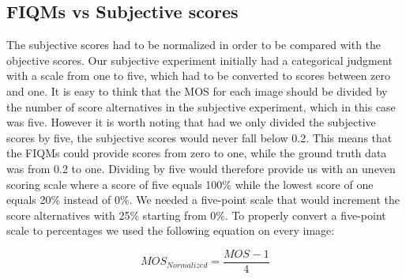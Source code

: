 \subsection{FIQMs vs Subjective scores}
The subjective scores had to be normalized in order to be compared with the objective scores. Our subjective experiment initially had a categorical judgment with a scale from one to five, which had to be converted to scores between zero and one. It is easy to think that the MOS for each image should be divided by the number of score alternatives in the subjective experiment, which in this case was five. However it is worth noting that had we only divided the subjective scores by five, the subjective scores would never fall below 0.2. This means that the FIQMs could provide scores from zero to one, while the ground truth data was from 0.2 to one. Dividing by five would therefore provide us with an uneven scoring scale where a score of five equals 100\% while the lowest score of one equals 20\% instead of 0\%. We needed a five-point scale that would increment the score alternatives with 25\% starting from 0\%. To properly convert a five-point scale to percentages we used the following equation on every image:

\begin{equation}
    MOS_{Normalized} = \frac{MOS_{} - 1}{4}
\end{equation}

